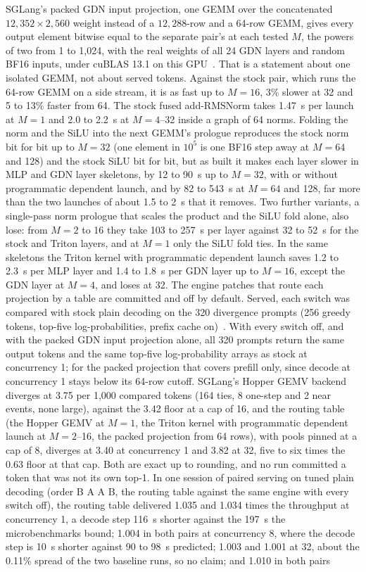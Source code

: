 SGLang's packed GDN input projection, one GEMM over the concatenated $12{,}352\times2{,}560$ weight instead of a $12{,}288$-row and a 64-row GEMM, gives every output element bitwise equal to the separate pair's at each tested $M$, the powers of two from 1 to 1,024, with the real weights of all 24 GDN layers and random BF16 inputs, under cuBLAS 13.1 on this GPU~. That is a statement about one isolated GEMM, not about served tokens. Against the stock pair, which runs the 64-row GEMM on a side stream, it is as fast up to $M=16$, 3\% slower at 32 and 5 to 13\% faster from 64. The stock fused add-RMSNorm takes 1.47~\textmu s per launch at $M=1$ and 2.0 to 2.2~\textmu s at $M=4$--32 inside a graph of 64 norms. Folding the norm and the SiLU into the next GEMM's prologue reproduces the stock norm bit for bit up to $M=32$ (one element in $10^5$ is one BF16 step away at $M=64$ and 128) and the stock SiLU bit for bit, but as built it makes each layer slower in MLP and GDN layer skeletons, by 12 to 90~\textmu s up to $M=32$, with or without programmatic dependent launch, and by 82 to 543~\textmu s at $M=64$ and 128, far more than the two launches of about 1.5 to 2~\textmu s that it removes. Two further variants, a single-pass norm prologue that scales the product and the SiLU fold alone, also lose: from $M=2$ to 16 they take 103 to 257~\textmu s per layer against 32 to 52~\textmu s for the stock and Triton layers, and at $M=1$ only the SiLU fold ties. In the same skeletons the Triton kernel with programmatic dependent launch saves 1.2 to 2.3~\textmu s per MLP layer and 1.4 to 1.8~\textmu s per GDN layer up to $M=16$, except the GDN layer at $M=4$, and loses at 32. The engine patches that route each projection by a table are committed and off by default. Served, each switch was compared with stock plain decoding on the 320 divergence prompts (256 greedy tokens, top-five log-probabilities, prefix cache on)~. With every switch off, and with the packed GDN input projection alone, all 320 prompts return the same output tokens and the same top-five log-probability arrays as stock at concurrency 1; for the packed projection that covers prefill only, since decode at concurrency 1 stays below its 64-row cutoff. SGLang's Hopper GEMV backend diverges at 3.75 per 1,000 compared tokens (164 ties, 8 one-step and 2 near events, none large), against the 3.42 floor at a cap of 16, and the routing table (the Hopper GEMV at $M=1$, the Triton kernel with programmatic dependent launch at $M=2$--16, the packed projection from 64 rows), with pools pinned at a cap of 8, diverges at 3.40 at concurrency 1 and 3.82 at 32, five to six times the 0.63 floor at that cap. Both are exact up to rounding, and no run committed a token that was not its own top-1. In one session of paired serving on tuned plain decoding (order B A A B, the routing table against the same engine with every switch off), the routing table delivered 1.035 and 1.034 times the throughput at concurrency 1, a decode step 116~\textmu s shorter against the 197~\textmu s the microbenchmarks bound; 1.004 in both pairs at concurrency 8, where the decode step is 10~\textmu s shorter against 90 to 98~\textmu s predicted; 1.003 and 1.001 at 32, about the 0.11\% spread of the two baseline runs, so no claim; and 1.010 in both pairs 